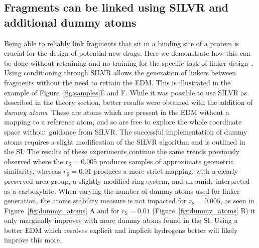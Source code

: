 \documentclass[journal=jacsat,manuscript=article]{achemso}
\begin{document}
\subsection{Fragments can be linked using SILVR and additional dummy atoms}
\label{sec:linker}
Being able to reliably link fragments that sit in a binding site of a protein is crucial for the design of potential new drugs. Here we demonstrate how this can be done  without retraining and no training for the specific task of linker design~\cite{huang20223dlinker,imrie2020deep}. Using conditioning through SILVR allows the generation of linkers between fragments without the need to retrain the EDM. This is illustrated in the example of Figure~\ref{fig:samples}E and F. While it was possible to use SILVR as described in the theory section, better results were obtained with the addition of \textit{dummy atoms}. These are atoms which are present in the EDM without a mapping to a reference atom, and so are free to explore the whole coordinate space without guidance from SILVR. The successful implementation of dummy atoms requires a slight modification of the SILVR algorithm and is outlined in the SI. The results of these experiments continue the same trends previously observed where the $r_{\mathrm{S}}=0.005$ produces samples of approximate geometric similarity, whereas $r_{\mathrm{S}}=0.01$ produces a more strict mapping, with a clearly preserved urea group, a slightly modified ring system, and an amide interpreted as a carboxylate. When varying the number of dummy atoms used for linker generation, the atoms stability measure is not impacted for $r_{\mathrm{S}}=0.005$, as seen in Figure~\ref{fig:dummy_atoms} A and for $r_{\mathrm{S}}=0.01$ (Figure~\ref{fig:dummy_atoms} B) it only marginally improves with more dummy atoms found in the SI. Using a better EDM which resolves explicit and implicit hydrogens better will likely improve this more. 

\end{document}
